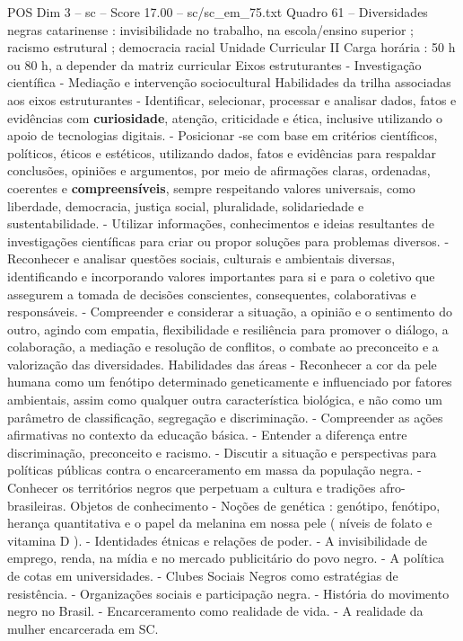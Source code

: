 \begin{textsample}{POS Dim 3 – sc – Score 17.00 – sc/sc\_em\_75.txt}
Quadro 61 – Diversidades negras catarinense : invisibilidade no trabalho, na escola/ensino superior ; racismo estrutural ; democracia racial Unidade Curricular II Carga horária : 50 h ou 80 h, a depender da matriz curricular Eixos estruturantes - Investigação científica - Mediação e intervenção sociocultural Habilidades da trilha associadas aos eixos estruturantes - Identificar, selecionar, processar e analisar dados, fatos e evidências com \textbf{curiosidade}, atenção, criticidade e ética, inclusive utilizando o apoio de tecnologias digitais. - Posicionar -se com base em critérios científicos, políticos, éticos e estéticos, utilizando dados, fatos e evidências para respaldar conclusões, opiniões e argumentos, por meio de afirmações claras, ordenadas, coerentes e \textbf{compreensíveis}, sempre respeitando valores universais, como liberdade, democracia, justiça social, pluralidade, solidariedade e sustentabilidade. - Utilizar informações, conhecimentos e ideias resultantes de investigações científicas para criar ou propor soluções para problemas diversos. - Reconhecer e analisar questões sociais, culturais e ambientais diversas, identificando e incorporando valores importantes para si e para o coletivo que assegurem a tomada de decisões conscientes, consequentes, colaborativas e responsáveis. - Compreender e considerar a situação, a opinião e o sentimento do outro, agindo com empatia, flexibilidade e resiliência para promover o diálogo, a colaboração, a mediação e resolução de conflitos, o combate ao preconceito e a valorização das diversidades.
Habilidades das áreas - Reconhecer a cor da pele humana como um fenótipo determinado geneticamente e influenciado por fatores ambientais, assim como qualquer outra característica biológica, e não como um parâmetro de classificação, segregação e discriminação. - Compreender as ações afirmativas no contexto da educação básica. - Entender a diferença entre discriminação, preconceito e racismo. - Discutir a situação e perspectivas para políticas públicas contra o encarceramento em massa da população negra. - Conhecer os territórios negros que perpetuam a cultura e tradições afro-brasileiras.
Objetos de conhecimento - Noções de genética : genótipo, fenótipo, herança quantitativa e o papel da melanina em nossa pele ( níveis de folato e vitamina D ). - Identidades étnicas e relações de poder. - A invisibilidade de emprego, renda, na mídia e no mercado publicitário do povo negro. - A política de cotas em universidades. - Clubes Sociais Negros como estratégias de resistência. - Organizações sociais e participação negra. - História do movimento negro no Brasil. - Encarceramento como realidade de vida. - A realidade da mulher encarcerada em SC.

\end{textsample}
